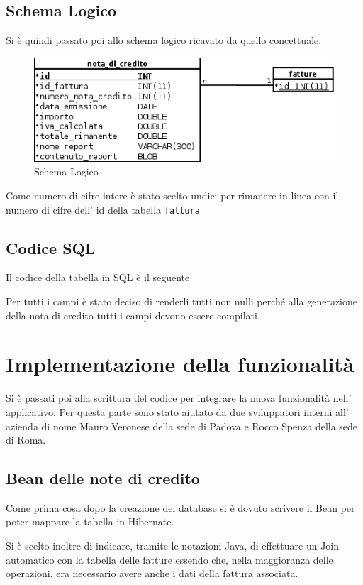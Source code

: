 \documentclass[12pt]{book}
\begin{document}
\subsection{Schema Logico}
Si è quindi passato poi allo schema logico ricavato da quello concettuale.
\begin{figure}[H]
    \centering
    \includegraphics[scale=0.5]{img/schema_logico}
    \caption{Schema Logico}\label{schema:logico}
\end{figure}
Come numero di cifre intere è stato scelto undici per rimanere in linea con il
numero di cifre dell' id della tabella \texttt{fattura}
\subsection{Codice SQL}
Il codice della tabella in SQL è il seguente

Per tutti i campi è stato deciso di renderli tutti non nulli perché alla
generazione della nota di credito tutti i campi devono essere compilati.
\section{Implementazione della funzionalità}
Si è passati poi alla scrittura del codice per integrare la nuova funzionalità
nell' applicativo.
Per questa parte sono stato aiutato da due sviluppatori interni all' azienda
di nome Mauro Veronese della sede di Padova e Rocco Spenza della sede di Roma.
\subsection{Bean delle note di credito}
Come prima cosa dopo la creazione del database si è dovuto scrivere il Bean per 
poter mappare la tabella in Hibernate.

Si è scelto inoltre di indicare, tramite le notazioni Java, di effettuare un Join
automatico con la tabella delle fatture essendo che, nella maggioranza delle 
operazioni, era necessario avere anche i dati della fattura associata.
\end{document}
